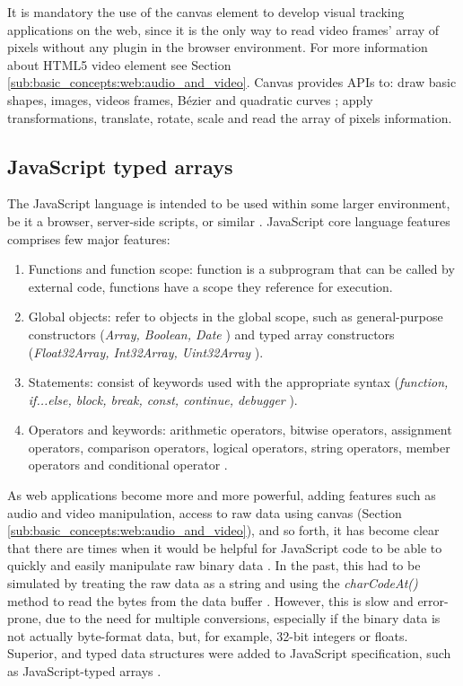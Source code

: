 It is mandatory the use of the canvas element to develop visual tracking applications on the web, since it is the only way to read video frames' array of pixels without any plugin in the browser environment. For more information about HTML5 video element see Section \ref{sub:basic_concepts:web:audio_and_video}. Canvas provides APIs to: draw basic shapes, images, videos frames, Bézier \cite{piegl1993fundamental} and quadratic curves \cite{piegl1993fundamental,Hartley2004}; apply transformations, translate, rotate, scale and read the array of pixels information.


\subsection{JavaScript typed arrays} %
\label{sub:basic_concepts:web:javascript_typed_arrays}

The JavaScript language \cite{International2009} is intended to be used within some larger environment, be it a browser, server-side scripts, or similar \cite{Grosskurth2005}. JavaScript core language features comprises few major features:

\begin{enumerate}
\item Functions and function scope: function is a subprogram that can be called by external code, functions have a scope they reference for execution.
\item Global objects: refer to objects in the global scope, such as general-purpose constructors (\textit{Array, Boolean, Date} \etc) and typed array constructors (\textit{Float32Array, Int32Array, Uint32Array} \etc).
\item Statements: consist of keywords used with the appropriate syntax (\textit{function, if...else, block, break, const, continue, debugger \etc}).
\item Operators and keywords: arithmetic operators, bitwise operators, assignment operators, comparison operators, logical operators, string operators, member operators and conditional operator \cite{MDN2013}.
\end{enumerate}

As web applications become more and more powerful, adding features such as audio and video manipulation, access to raw data using canvas (Section \ref{sub:basic_concepts:web:audio_and_video}), and so forth, it has become clear that there are times when it would be helpful for JavaScript code to be able to quickly and easily manipulate raw binary data \cite{Canvas2013,TypedArray2013}. In the past, this had to be simulated by treating the raw data as a string and using the \textit{charCodeAt()} method to read the bytes from the data buffer \cite{MDN2013,TypedArray2013}. However, this is slow and error-prone, due to the need for multiple conversions, especially if the binary data is not actually byte-format data, but, for example, 32-bit integers or floats. Superior, and typed data structures were added to JavaScript specification, such as JavaScript-typed arrays \cite{MDN2013,International2009}.

